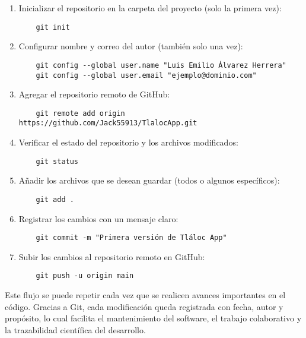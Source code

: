 \begin{enumerate}
    \item Inicializar el repositorio en la carpeta del proyecto (solo la primera vez):
    \begin{verbatim}
    git init
    \end{verbatim}
    
    \item Configurar nombre y correo del autor (también solo una vez):
    \begin{verbatim}
    git config --global user.name "Luis Emilio Álvarez Herrera"
    git config --global user.email "ejemplo@dominio.com"
    \end{verbatim}
    
    \item Agregar el repositorio remoto de GitHub:
    \begin{verbatim}
    git remote add origin https://github.com/Jack55913/TlalocApp.git
    \end{verbatim}
    
    \item Verificar el estado del repositorio y los archivos modificados:
    \begin{verbatim}
    git status
    \end{verbatim}
    
    \item Añadir los archivos que se desean guardar (todos o algunos específicos):
    \begin{verbatim}
    git add .
    \end{verbatim}
    
    \item Registrar los cambios con un mensaje claro:
    \begin{verbatim}
    git commit -m "Primera versión de Tláloc App"
    \end{verbatim}
    
    \item Subir los cambios al repositorio remoto en GitHub:
    \begin{verbatim}
    git push -u origin main
    \end{verbatim}
\end{enumerate}

Este flujo se puede repetir cada vez que se realicen avances importantes en el código. Gracias a Git, cada modificación queda registrada con fecha, autor y propósito, lo cual facilita el mantenimiento del software, el trabajo colaborativo y la trazabilidad científica del desarrollo.

